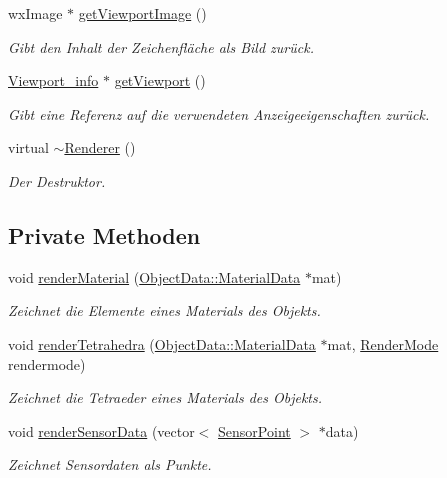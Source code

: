 \begin{DoxyCompactItemize}
wx\-Image $\ast$ \hyperlink{classRenderer_afe4e5a9e26320e0b8276b2d0f82a1827}{get\-Viewport\-Image} ()
\begin{DoxyCompactList}\small\item\em Gibt den Inhalt der Zeichenfläche als Bild zurück. \end{DoxyCompactList}\item 
\hyperlink{structRenderer_1_1Viewport__info}{Viewport\-\_\-info} $\ast$ \hyperlink{classRenderer_a5bfa9daf1a53660f1cf6c254665253e2}{get\-Viewport} ()
\begin{DoxyCompactList}\small\item\em Gibt eine Referenz auf die verwendeten Anzeigeeigenschaften zurück. \end{DoxyCompactList}\item 
virtual \hyperlink{classRenderer_afeee408862d5bd6255a6882d47e6d5cd}{$\sim$\-Renderer} ()
\begin{DoxyCompactList}\small\item\em Der Destruktor. \end{DoxyCompactList}\end{DoxyCompactItemize}
\subsection*{Private Methoden}
\begin{DoxyCompactItemize}
\item 
void \hyperlink{classRenderer_acb6c468b92221cf8a121b87a70a3da0c}{render\-Material} (\hyperlink{structObjectData_1_1MaterialData}{Object\-Data\-::\-Material\-Data} $\ast$mat)
\begin{DoxyCompactList}\small\item\em Zeichnet die Elemente eines Materials des Objekts. \end{DoxyCompactList}\item 
void \hyperlink{classRenderer_a927f376a6283de3181b86f65b927386c}{render\-Tetrahedra} (\hyperlink{structObjectData_1_1MaterialData}{Object\-Data\-::\-Material\-Data} $\ast$mat, \hyperlink{classRenderer_aa9844470f59e9fdf3aed088936100863}{Render\-Mode} rendermode)
\begin{DoxyCompactList}\small\item\em Zeichnet die Tetraeder eines Materials des Objekts. \end{DoxyCompactList}\item 
void \hyperlink{classRenderer_ad2eac0343aef1abd05ed95b1b364785f}{render\-Sensor\-Data} (vector$<$ \hyperlink{structUtils_1_1SensorPoint}{Sensor\-Point} $>$ $\ast$data)
\begin{DoxyCompactList}\small\item\em Zeichnet Sensordaten als Punkte. \end{DoxyCompactList}\end{DoxyCompactItemize}
